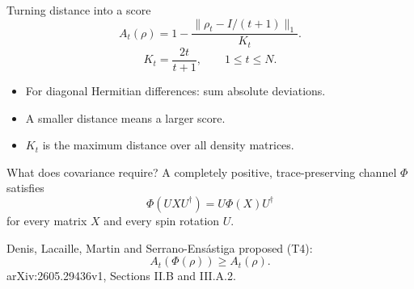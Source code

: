 \documentclass{beamer}
\begin{document}
\begin{frame}{Turning distance into a score}
\[ A_t(\rho)=1-\frac{\|\rho_t-I/(t+1)\|_1}{K_t}. \]
\[ K_t=\frac{2t}{t+1},\qquad 1\leq t\leq N. \]
\begin{itemize}
\item For diagonal Hermitian differences: sum absolute deviations.
\item A smaller distance means a larger score.
\item $K_t$ is the maximum distance over all density matrices.
\end{itemize}
\end{frame}
\begin{frame}{What does covariance require?}
A completely positive, trace-preserving channel $\Phi$ satisfies
\[\Phi(UXU^\dagger)=U\Phi(X)U^\dagger\]
for every matrix $X$ and every spin rotation $U$.
\medskip

Denis, Lacaille, Martin and Serrano-Ens\'astiga proposed (T4):
\[A_t(\Phi(\rho))\geq A_t(\rho).\]
\small arXiv:2605.29436v1, Sections II.B and III.A.2.
\end{frame}
\end{document}
